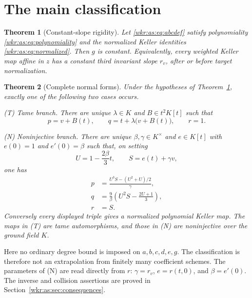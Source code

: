 \documentclass[11pt,a4paper]{article}
\numberwithin{equation}{section}
\newtheorem{theorem}{Theorem}[section]
\theoremstyle{definition}
\theoremstyle{remark}
\begin{document}
\section{The main classification}
\label{wkr:as:sec:main}

\begin{theorem}[Constant-slope rigidity]\label{wkr:as:thm:slope}
Let \eqref{wkr:as:eq:abcdef} satisfy polynomiality
\eqref{wkr:as:eq:polynomiality} and the normalized Keller identities
\eqref{wkr:as:eq:normalized}. Then $g$ is constant. Equivalently, every
weighted Keller map affine in $z$ has a constant third invariant slope
$r_v$, after or before target normalization.
\end{theorem}

\begin{theorem}[Complete normal forms]\label{wkr:as:thm:classification}
Under the hypotheses of Theorem~\ref{wkr:as:thm:slope}, exactly one of the
following two cases occurs.

\smallskip
\noindent\textup{(T) Tame branch.} There are unique
$\lambda\in K$ and $B\in t^2K[t]$ such that
\begin{equation}\label{wkr:as:eq:tame-normal}
p=v+B(t),\qquad q=t+\lambda\bigl(v+B(t)\bigr),\qquad r=1.
\end{equation}

\smallskip
\noindent\textup{(N) Noninjective branch.} There are unique
$\beta,\gamma\in K^\times$ and $e\in K[t]$ with
$e(0)=1$ and $e'(0)=\beta$ such that, on setting
\begin{equation}\label{wkr:as:eq:US}
U=1-\frac{2\beta}{3}t,\qquad S=e(t)+\gamma v,
\end{equation}
one has
\begin{align}
p&=\frac{U^3S-(U^2+U)/2}{\gamma},\label{wkr:as:eq:normalp}\\
q&=\frac9\beta\left(U^2S-\frac{2U+1}{3}\right),\label{wkr:as:eq:normalq}\\
r&=S.\label{wkr:as:eq:normalr}
\end{align}
Conversely every displayed triple gives a normalized polynomial Keller
map. The maps in \textup{(T)} are tame automorphisms, and those in
\textup{(N)} are noninjective over the ground field $K$.
\end{theorem}

Here no ordinary degree bound is imposed on $a,b,c,d,e,g$. The
classification is therefore not an extrapolation from finitely many
coefficient schemes. The parameters of (N) are read directly from $r$:
$\gamma=r_v$, $e=r(t,0)$, and $\beta=e'(0)$. The inverse and collision
assertions are proved in Section~\ref{wkr:as:sec:consequences}.
\end{document}
